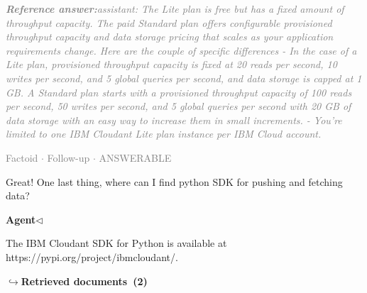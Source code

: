 \documentclass[a4paper,11pt]{article}
\begin{document}
\begin{refanswerenv}
{\footnotesize\textit{\textcolor{gray}{\textbf{Reference answer:}\enspace assistant: The Lite plan is free but has a fixed amount of throughput capacity. The paid Standard plan offers configurable provisioned throughput capacity and data storage pricing that scales as your application requirements change. Here are the couple of specific differences - In the case of a Lite plan, provisioned throughput capacity is fixed at 20 reads per second, 10 writes per second, and 5 global queries per second, and data storage is capped at 1 GB. A Standard plan starts with a provisioned throughput capacity of 100 reads per second, 50 writes per second, and 5 global queries per second with 20 GB of data storage with an easy way to increase them in small increments. - You're limited to one IBM Cloudant Lite plan instance per IBM Cloud account.}}}
\end{refanswerenv}
\vspace{0.5em}
\hfill{\tiny\textcolor{gray}{Factoid $\cdot$ Follow-up $\cdot$ ANSWERABLE}}
\begin{userbubble}
Great! One last thing, where can I find python SDK for pushing and fetching data? 
\end{userbubble}
\noindent\hfill{\small\textcolor{agentcolor}{\textbf{Agent\enspace$\triangleleft$}}}
\begin{agentbubble}
The IBM Cloudant SDK for Python is available at https://pypi.org/project/ibmcloudant/.
\end{agentbubble}
\noindent\hfill{\footnotesize\textcolor{doccolor}{\textbf{$\hookrightarrow$\enspace Retrieved documents~(2)}}}
\end{document}
